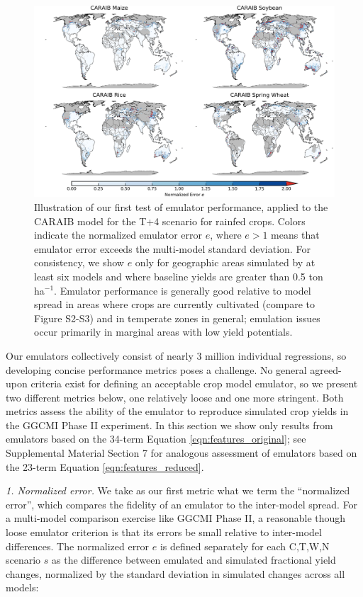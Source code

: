 \documentclass[gmd, manuscript]{copernicus} %
\begin{document}
\begin{figure}[ht]
\centering
    \includegraphics[width=16.3cm]{figures/CARAIB_spatial_error.png}
    \caption{
    Illustration of our first test of emulator performance, applied to the CARAIB model for the T+4 scenario for rainfed crops. 
    Colors indicate the normalized emulator error $e$, where $e > 1$ means that emulator error exceeds the multi-model standard deviation. 
    For consistency, we show $e$ only for geographic areas simulated by at least six models and where baseline yields are greater than 0.5 ton ha$^{-1}$.
    Emulator performance is generally good relative to model spread in areas where crops are currently cultivated (compare to Figure S2-S3) and in temperate zones in general; emulation issues occur primarily in marginal areas with low yield potentials. 
    }
   \label{fig:error}
\end{figure}

Our emulators collectively consist of nearly 3 million individual regressions, so developing concise performance metrics poses a challenge.
No general agreed-upon criteria exist for defining an acceptable crop model emulator, so we present two different metrics below, one relatively loose and one more stringent.  
Both metrics assess the ability of the emulator to reproduce simulated crop yields in the GGCMI Phase II experiment. 
In this section we show only results from emulators based on the 34-term Equation \ref{eqn:features_original};
see Supplemental Material Section 7 for analogous assessment of emulators based on the 23-term Equation \ref{eqn:features_reduced}.

\smallskip
\textit{1. Normalized error.} 
We take as our first metric what we term the ``normalized error'', which compares the fidelity of an emulator to the inter-model spread. 
For a multi-model comparison exercise like GGCMI Phase II, a reasonable though loose emulator criterion is that its errors be small relative to inter-model differences. The normalized error $e$ is defined separately for each C,T,W,N scenario $s$ as the difference between emulated and simulated fractional yield changes, normalized by the standard deviation in simulated changes across all models: 
\end{document}

